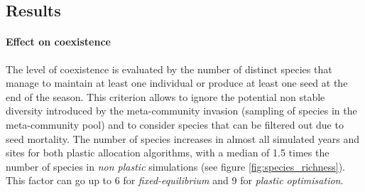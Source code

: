 \subsection{Results}

%

\paragraph{Effect on coexistence}

The level of coexistence is evaluated by the number of distinct species that manage to maintain at least one individual or produce at least one seed at the end of the season. This criterion allows to ignore the potential non stable diversity introduced by the meta-community invasion (sampling of species in the meta-community pool) and to consider species that can be filtered out due to seed mortality. The number of species increases in almost all simulated years and sites for both plastic allocation algorithms, with a median of 1.5 times the number of species in \textit{non plastic} simulations (see figure \ref{fig:species_richness}). This factor can go up to 6 for \textit{fixed-equilibrium} and 9 for \textit{plastic optimisation}.


